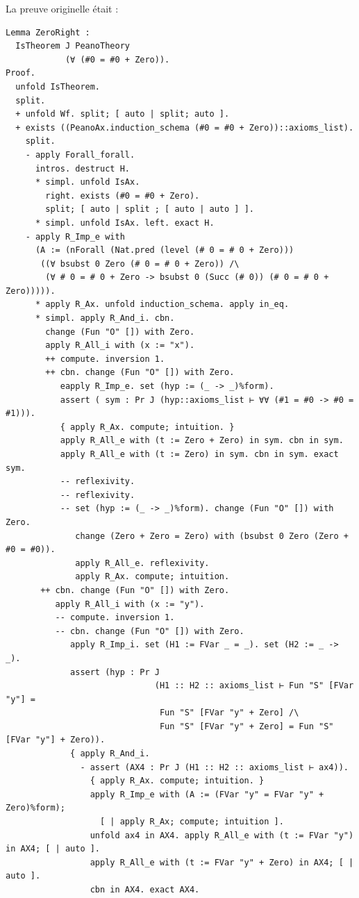\documentclass[a4paper]{article}
\theoremstyle{remark}
\theoremstyle{remark}
\theoremstyle{remark}
\theoremstyle{definition}
\theoremstyle{definition}
\theoremstyle{definition}
\begin{document}
La preuve originelle était :
\begin{verbatim}
Lemma ZeroRight :
  IsTheorem J PeanoTheory
            (∀ (#0 = #0 + Zero)).
Proof.
  unfold IsTheorem.
  split.
  + unfold Wf. split; [ auto | split; auto ].
  + exists ((PeanoAx.induction_schema (#0 = #0 + Zero))::axioms_list).
    split.
    - apply Forall_forall.
      intros. destruct H.
      * simpl. unfold IsAx.
        right. exists (#0 = #0 + Zero).
        split; [ auto | split ; [ auto | auto ] ].
      * simpl. unfold IsAx. left. exact H.
    - apply R_Imp_e with
      (A := (nForall (Nat.pred (level (# 0 = # 0 + Zero)))
       ((∀ bsubst 0 Zero (# 0 = # 0 + Zero)) /\
        (∀ # 0 = # 0 + Zero -> bsubst 0 (Succ (# 0)) (# 0 = # 0 + Zero))))).
      * apply R_Ax. unfold induction_schema. apply in_eq.
      * simpl. apply R_And_i. cbn.
        change (Fun "O" []) with Zero.
        apply R_All_i with (x := "x").
        ++ compute. inversion 1.
        ++ cbn. change (Fun "O" []) with Zero.
           eapply R_Imp_e. set (hyp := (_ -> _)%form).
           assert ( sym : Pr J (hyp::axioms_list ⊢ ∀∀ (#1 = #0 -> #0 = #1))).
           { apply R_Ax. compute; intuition. }
           apply R_All_e with (t := Zero + Zero) in sym. cbn in sym.
           apply R_All_e with (t := Zero) in sym. cbn in sym. exact sym.
           -- reflexivity.
           -- reflexivity.
           -- set (hyp := (_ -> _)%form). change (Fun "O" []) with Zero.
              change (Zero + Zero = Zero) with (bsubst 0 Zero (Zero + #0 = #0)).
              apply R_All_e. reflexivity.
              apply R_Ax. compute; intuition.
       ++ cbn. change (Fun "O" []) with Zero.
          apply R_All_i with (x := "y").
          -- compute. inversion 1.
          -- cbn. change (Fun "O" []) with Zero.
             apply R_Imp_i. set (H1 := FVar _ = _). set (H2 := _ -> _).
             assert (hyp : Pr J
                              (H1 :: H2 :: axioms_list ⊢ Fun "S" [FVar "y"] =
                               Fun "S" [FVar "y" + Zero] /\
                               Fun "S" [FVar "y" + Zero] = Fun "S" [FVar "y"] + Zero)).
             { apply R_And_i.
               - assert (AX4 : Pr J (H1 :: H2 :: axioms_list ⊢ ax4)).
                 { apply R_Ax. compute; intuition. }
                 apply R_Imp_e with (A := (FVar "y" = FVar "y" + Zero)%form);
                   [ | apply R_Ax; compute; intuition ].
                 unfold ax4 in AX4. apply R_All_e with (t := FVar "y") in AX4; [ | auto ].
                 apply R_All_e with (t := FVar "y" + Zero) in AX4; [ | auto ].
                 cbn in AX4. exact AX4. 

\end{verbatim}
\end{document}
